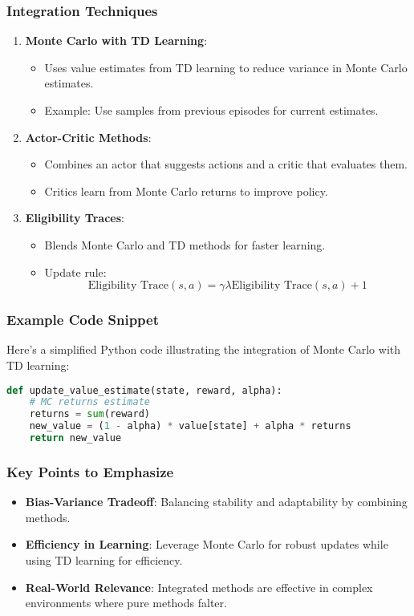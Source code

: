 \documentclass[aspectratio=169]{beamer}
\begin{document}
\begin{frame}[fragile]
    \frametitle{Integration Techniques}
    \begin{enumerate}
        \item \textbf{Monte Carlo with TD Learning}:
            \begin{itemize}
                \item Uses value estimates from TD learning to reduce variance in Monte Carlo estimates.
                \item Example: Use samples from previous episodes for current estimates.
            \end{itemize}
        \item \textbf{Actor-Critic Methods}:
            \begin{itemize}
                \item Combines an actor that suggests actions and a critic that evaluates them.
                \item Critics learn from Monte Carlo returns to improve policy.
            \end{itemize}
        \item \textbf{Eligibility Traces}:
            \begin{itemize}
                \item Blends Monte Carlo and TD methods for faster learning.
                \item Update rule: 
                \[
                \text{Eligibility Trace}(s, a) = \gamma \lambda \text{Eligibility Trace}(s, a) + 1
                \]
            \end{itemize}
    \end{enumerate}
\end{frame}

\begin{frame}[fragile]
    \frametitle{Example Code Snippet}
    Here’s a simplified Python code illustrating the integration of Monte Carlo with TD learning:
    \begin{lstlisting}[language=Python]
def update_value_estimate(state, reward, alpha):
    # MC returns estimate
    returns = sum(reward)
    new_value = (1 - alpha) * value[state] + alpha * returns
    return new_value
    \end{lstlisting}
\end{frame}

\begin{frame}[fragile]
    \frametitle{Key Points to Emphasize}
    \begin{itemize}
        \item \textbf{Bias-Variance Tradeoff}: Balancing stability and adaptability by combining methods.
        \item \textbf{Efficiency in Learning}: Leverage Monte Carlo for robust updates while using TD learning for efficiency.
        \item \textbf{Real-World Relevance}: Integrated methods are effective in complex environments where pure methods falter.
    \end{itemize}
\end{frame}
\end{document}
